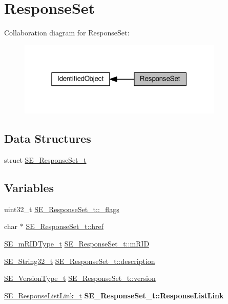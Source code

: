 \hypertarget{group__ResponseSet}{}\section{Response\+Set}
\label{group__ResponseSet}
Collaboration diagram for Response\+Set\+:\nopagebreak
\begin{figure}[H]
\begin{center}
\leavevmode
\includegraphics[width=277pt]{group__ResponseSet}
\end{center}
\end{figure}
\subsection*{Data Structures}
\begin{DoxyCompactItemize}
\item 
struct \hyperlink{structSE__ResponseSet__t}{S\+E\+\_\+\+Response\+Set\+\_\+t}
\end{DoxyCompactItemize}
\subsection*{Variables}
\begin{DoxyCompactItemize}
\item 
uint32\+\_\+t \hyperlink{group__ResponseSet_gab868eef3d41febb6b3e414b6c13a4f1b}{S\+E\+\_\+\+Response\+Set\+\_\+t\+::\+\_\+flags}
\item 
char $\ast$ \hyperlink{group__ResponseSet_gab8c5075bf443fd440f1a68ae0d6bd848}{S\+E\+\_\+\+Response\+Set\+\_\+t\+::href}
\item 
\hyperlink{group__mRIDType_gac74622112f3a388a2851b2289963ba5e}{S\+E\+\_\+m\+R\+I\+D\+Type\+\_\+t} \hyperlink{group__ResponseSet_ga1d199a43dbc543c9fb19c99aca6ef451}{S\+E\+\_\+\+Response\+Set\+\_\+t\+::m\+R\+ID}
\item 
\hyperlink{group__String32_gac9f59b06b168b4d2e0d45ed41699af42}{S\+E\+\_\+\+String32\+\_\+t} \hyperlink{group__ResponseSet_ga718d5e90f483d93f6a1928b98f4195c9}{S\+E\+\_\+\+Response\+Set\+\_\+t\+::description}
\item 
\hyperlink{group__VersionType_ga4b8d27838226948397ed99f67d46e2ae}{S\+E\+\_\+\+Version\+Type\+\_\+t} \hyperlink{group__ResponseSet_gaefb52ca508dcbeaba72f17886899d590}{S\+E\+\_\+\+Response\+Set\+\_\+t\+::version}
\item 
\mbox{\label{group__ResponseSet_gae1184f482244a64720b02f35a5031ed8}} 
\hyperlink{structSE__ResponseListLink__t}{S\+E\+\_\+\+Response\+List\+Link\+\_\+t} {\bfseries S\+E\+\_\+\+Response\+Set\+\_\+t\+::\+Response\+List\+Link}
\end{DoxyCompactItemize}


